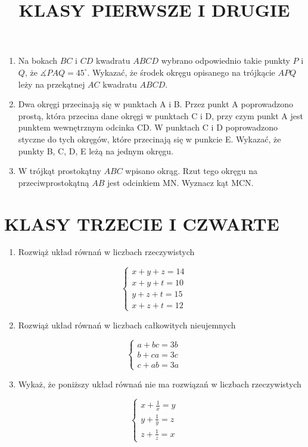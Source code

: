 \documentclass[10pt]{article}
\title{KLASY PIERWSZE I DRUGIE }
\author{}
\date{}
\begin{document}
\maketitle
\begin{enumerate}
  \item Na bokach \(B C\) i \(C D\) kwadratu \(A B C D\) wybrano odpowiednio takie punkty \(P\) i \(Q\), że \(\measuredangle P A Q=45^{\circ}\). Wykazać, że środek okręgu opisanego na trójkącie \(A P Q\) leży na przekątnej \(A C\) kwadratu \(A B C D\).
  \item Dwa okręgi przecinają się w punktach A i B. Przez punkt A poprowadzono prostą, która przecina dane okręgi w punktach C i D, przy czym punkt A jest punktem wewnętrznym odcinka CD. W punktach C i D poprowadzono styczne do tych okręgów, które przecinają się w punkcie E. Wykazać, że punkty B, C, D, E leżą na jednym okręgu.
  \item W trójkąt prostokątny \(A B C\) wpisano okrąg. Rzut tego okręgu na przeciwprostokątną \(A B\) jest odcinkiem MN. Wyznacz kąt MCN.
\end{enumerate}

\section*{KLASY TRZECIE I CZWARTE}
\begin{enumerate}
  \item Rozwiąż układ równań w liczbach rzeczywistych
\end{enumerate}

\[
\left\{\begin{array}{l}
x+y+z=14 \\
x+y+t=10 \\
y+z+t=15 \\
x+z+t=12
\end{array}\right.
\]

\begin{enumerate}
  \setcounter{enumi}{1}
  \item Rozwiąż układ równań w liczbach całkowitych nieujemnych
\end{enumerate}

\[
\left\{\begin{array}{l}
a+b c=3 b \\
b+c a=3 c \\
c+a b=3 a
\end{array}\right.
\]

\begin{enumerate}
  \setcounter{enumi}{2}
  \item Wykaż, że poniższy układ równań nie ma rozwiązań w liczbach rzeczywistych
\end{enumerate}

\[
\left\{\begin{array}{l}
x+\frac{1}{x}=y \\
y+\frac{1}{y}=z \\
z+\frac{1}{z}=x
\end{array}\right.
\]
\end{document}
